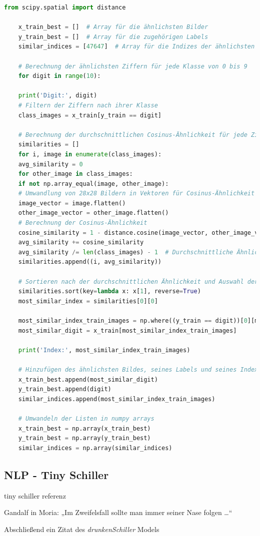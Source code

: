 \documentclass[
fontsize=12pt,					%
paper=a4,						%
twoside=true, 					%
listof=totoc, 					%
bibliography=totoc,				%
titlepage, 						%
headsepline, 					%
DIV=12,							%
BCOR=6mm,						%
cleardoublepage=empty,			%
parskip,							%
ngerman
]{scrartcl}
\begin{document}
\begin{lstlisting}[language=Python, caption=Python-Code, label=python_code]
	from scipy.spatial import distance
	
	x_train_best = []  # Array für die ähnlichsten Bilder
	y_train_best = []  # Array für die zugehörigen Labels
	similar_indices = [47647]  # Array für die Indizes der ähnlichsten Bilder
	
	# Berechnung der ähnlichsten Ziffern für jede Klasse von 0 bis 9
	for digit in range(10):
	
	print('Digit:', digit)
	# Filtern der Ziffern nach ihrer Klasse
	class_images = x_train[y_train == digit]
	
	# Berechnung der durchschnittlichen Cosinus-Ähnlichkeit für jede Ziffer zu anderen Ziffern derselben Klasse
	similarities = []
	for i, image in enumerate(class_images):
	avg_similarity = 0
	for other_image in class_images:
	if not np.array_equal(image, other_image):
	# Umwandlung von 28x28 Bildern in Vektoren für Cosinus-Ähnlichkeit
	image_vector = image.flatten()
	other_image_vector = other_image.flatten()
	# Berechnung der Cosinus-Ähnlichkeit
	cosine_similarity = 1 - distance.cosine(image_vector, other_image_vector)
	avg_similarity += cosine_similarity
	avg_similarity /= len(class_images) - 1  # Durchschnittliche Ähnlichkeit zu allen anderen Ziffern der Klasse außer sich selbst
	similarities.append((i, avg_similarity))
	
	# Sortieren nach der durchschnittlichen Ähnlichkeit und Auswahl der ähnlichsten Ziffer
	similarities.sort(key=lambda x: x[1], reverse=True)
	most_similar_index = similarities[0][0]
	
	most_similar_index_train_images = np.where((y_train == digit))[0][most_similar_index]
	most_similar_digit = x_train[most_similar_index_train_images]
	
	print('Index:', most_similar_index_train_images)
	
	# Hinzufügen des ähnlichsten Bildes, seines Labels und seines Index im train_images Array in den Arrays
	x_train_best.append(most_similar_digit)
	y_train_best.append(digit)
	similar_indices.append(most_similar_index_train_images)
	
	# Umwandeln der Listen in numpy arrays
	x_train_best = np.array(x_train_best)
	y_train_best = np.array(y_train_best)
	similar_indices = np.array(similar_indices)
\end{lstlisting}

\subsection{NLP - Tiny Schiller}

tiny schiller referenz

Gandalf in Moria: „Im Zweifelsfall sollte man immer seiner Nase folgen …“




Abschließend ein Zitat des \emph{drunkenSchiller} Models
\end{document}
